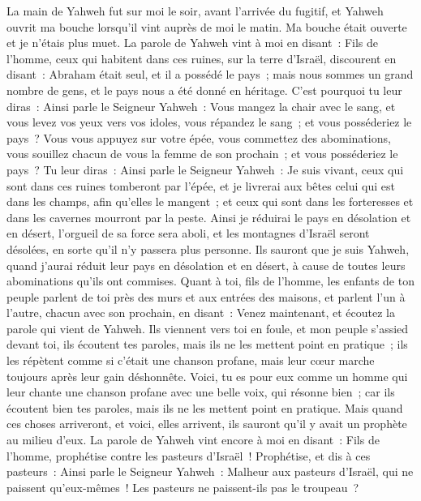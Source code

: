 \begin{multicols}{2}
La main de Yahweh fut sur moi le soir, avant l'arrivée du fugitif, et Yahweh ouvrit ma bouche lorsqu'il vint auprès de moi le matin. Ma bouche était ouverte et je n'étais plus muet.
La parole de Yahweh vint à moi en disant~:
Fils de l'homme, ceux qui habitent dans ces ruines, sur la terre d'Israël, discourent en disant~: Abraham était seul, et il a possédé le pays~; mais nous sommes un grand nombre de gens, et le pays nous a été donné en héritage.
C'est pourquoi tu leur diras~: Ainsi parle le Seigneur Yahweh~: Vous mangez la chair avec le sang, et vous levez vos yeux vers vos idoles, vous répandez le sang~; et vous posséderiez le pays~?
Vous vous appuyez sur votre épée, vous commettez des abominations, vous souillez chacun de vous la femme de son prochain~; et vous posséderiez le pays~?
Tu leur diras~: Ainsi parle le Seigneur Yahweh~: Je suis vivant, ceux qui sont dans ces ruines tomberont par l'épée, et je livrerai aux bêtes celui qui est dans les champs, afin qu'elles le mangent~; et ceux qui sont dans les forteresses et dans les cavernes mourront par la peste.
Ainsi je réduirai le pays en désolation et en désert, l'orgueil de sa force sera aboli, et les montagnes d'Israël seront désolées, en sorte qu'il n'y passera plus personne.
Ils sauront que je suis Yahweh, quand j'aurai réduit leur pays en désolation et en désert, à cause de toutes leurs abominations qu'ils ont commises.
Quant à toi, fils de l'homme, les enfants de ton peuple parlent de toi près des murs et aux entrées des maisons, et parlent l'un à l'autre, chacun avec son prochain, en disant~: Venez maintenant, et écoutez la parole qui vient de Yahweh.
Ils viennent vers toi en foule, et mon peuple s'assied devant toi, ils écoutent tes paroles, mais ils ne les mettent point en pratique~; ils les répètent comme si c'était une chanson profane, mais leur cœur marche toujours après leur gain déshonnête.
Voici, tu es pour eux comme un homme qui leur chante une chanson profane avec une belle voix, qui résonne bien~; car ils écoutent bien tes paroles, mais ils ne les mettent point en pratique.
Mais quand ces choses arriveront, et voici, elles arrivent, ils sauront qu'il y avait un prophète au milieu d'eux.
\VerseOne{}La parole de Yahweh vint encore à moi en disant~:
Fils de l'homme, prophétise contre les pasteurs d'Israël~! Prophétise, et dis à ces pasteurs~: Ainsi parle le Seigneur Yahweh~: Malheur aux pasteurs d'Israël, qui ne paissent qu'eux-mêmes~! Les pasteurs ne paissent-ils pas le troupeau~?

\end{multicols}
